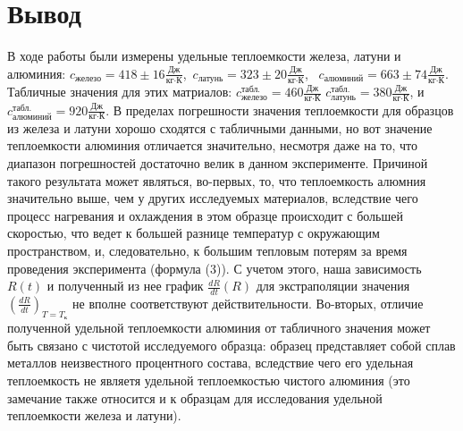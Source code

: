 \documentclass[12pt,a4paper]{article}
\begin{document}
	

\section{Вывод}

	\item В ходе работы были измерены удельные теплоемкости железа, латуни и алюминия: $c_{\text{железо}} = 418\pm 16 \frac{\text{Дж}}{\text{кг}\cdot\text{К}}$,~$c_{\text{латунь}} = 323\pm 20 \frac{\text{Дж}}{\text{кг}\cdot\text{К}}$,~ $c_{\text{алюминий}} = 663\pm 74 \frac{\text{Дж}}{\text{кг}\cdot\text{К}}$. Табличные значения для этих матриалов: $c^{\text{табл.}}_{\text{железо}} = 460 \frac{\text{Дж}}{\text{кг}\cdot\text{К}}$ $c^{\text{табл.}}_{\text{латунь}} = 380 \frac{\text{Дж}}{\text{кг}\cdot\text{К}}$,  и $c^{\text{табл.}}_{\text{алюминий}} = 920 \frac{\text{Дж}}{\text{кг}\cdot\text{К}}$. В пределах погрешности значения теплоемкости для образцов из железа и латуни хорошо сходятся с табличными данными, но вот значение теплоемкости алюминия отличается значительно, несмотря даже на то, что диапазон погрешностей достаточно велик в данном эксперименте. Причиной такого результата может являться, во-первых, то, что теплоемкость алюмния значительно выше, чем у других исследуемых материалов, вследствие чего процесс нагревания и охлаждения в этом образце происходит с большей скоростью, что ведет к большей разнице температур с окружающим пространством, и, следовательно, к большим тепловым потерям за время проведения эксперимента (формула (3)). С учетом этого, наша зависимость $R(t)$ и полученный из нее график $\frac{dR}{dt} \left( R \right)$ для экстраполяции значения $(\frac{dR}{dt})_{T = T_{\text{к}}}$ не вполне соответствуют действительности. Во-вторых, отличие полученной удельной теплоемкости алюминия от табличного значения может быть связано с чистотой исследуемого образца: образец представляет собой сплав металлов неизвестного процентного состава, вследствие чего его удельная теплоемкость не являетя удельной теплоемкостью чистого  алюминия (это замечание также относится и к образцам для исследования удельной теплоемкости железа и латуни). 
\end{document}
